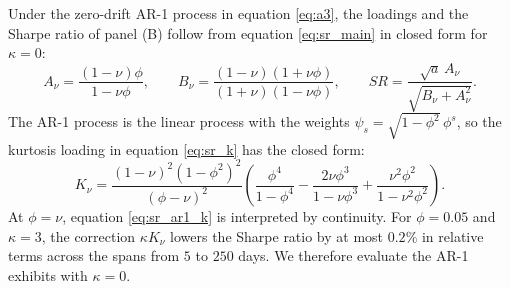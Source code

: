 \documentclass[hidelinks]{siamonline250211}
\begin{document}
Under the zero-drift AR-1 process in equation \eqref{eq:a3}, the loadings and the Sharpe ratio of panel (B) follow from equation \eqref{eq:sr_main} in closed form for $\kappa=0$:
\begin{equation} \label{eq:sr_ar1}
	A_{\nu} = \frac{(1-\nu)\phi}{1-\nu\phi}, \qquad B_{\nu} = \frac{(1-\nu)(1+\nu\phi)}{(1+\nu)(1-\nu\phi)}, \qquad SR = \frac{\sqrt{a}\,A_{\nu}}{\sqrt{B_{\nu}+A^{2}_{\nu}}}.
\end{equation}
The AR-1 process is the linear process with the weights $\psi_{s}=\sqrt{1-\phi^{2}}\,\phi^{s}$, so the kurtosis loading in equation \eqref{eq:sr_k} has the closed form:
\begin{equation} \label{eq:sr_ar1_k}
	K_{\nu} = \frac{(1-\nu)^{2}(1-\phi^{2})^{2}}{(\phi-\nu)^{2}} \left( \frac{\phi^{4}}{1-\phi^{4}} - \frac{2\nu\phi^{3}}{1-\nu\phi^{3}} + \frac{\nu^{2}\phi^{2}}{1-\nu^{2}\phi^{2}} \right).
\end{equation}
At $\phi=\nu$, equation \eqref{eq:sr_ar1_k} is interpreted by continuity.
For $\phi=0.05$ and $\kappa=3$, the correction $\kappa K_{\nu}$ lowers the Sharpe ratio by at most $0.2\%$ in relative terms across the spans from $5$ to $250$ days. We therefore evaluate the AR-1 exhibits with $\kappa=0$.
\end{document}
